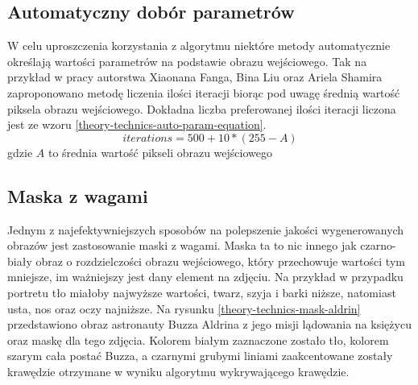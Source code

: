 \documentclass[a4paper, 12pt, polish, twoside]{extreport}
\begin{document}
        \subsection{Automatyczny dobór parametrów}  \label{theory-technics-auto-param}
        W celu uproszczenia korzystania z algorytmu niektóre metody automatycznie określają wartości parametrów na podstawie obrazu wejściowego. Tak na przykład w pracy autorstwa Xiaonana Fanga, Bina Liu oraz Ariela Shamira \cite{article-string-art-xiaonan} zaproponowano metodę liczenia ilości iteracji biorąc pod uwagę średnią wartość piksela obrazu wejściowego. Dokładna liczba preferowanej ilości iteracji liczona jest ze wzoru \ref{theory-technics-auto-param-equation}. 
        \begin{equation} \label{theory-technics-auto-param-equation}
            iterations = 500 + 10 * (255 - A)
        \end{equation}
        gdzie \(A\) to średnia wartość pikseli obrazu wejściowego
        
        \subsection{Maska z wagami}
        Jednym z najefektywniejszych sposobów na polepszenie jakości wygenerowanych obrazów jest zastosowanie maski z wagami. Maska ta to nic innego jak czarno-biały obraz o rozdzielczości obrazu wejściowego, który przechowuje wartości tym mniejsze, im ważniejszy jest dany element na zdjęciu. Na przykład w przypadku portretu tło miałoby najwyższe wartości, twarz, szyja i barki niższe, natomiast usta, nos oraz oczy najniższe. Na rysunku \ref{theory-technics-mask-aldrin} przedstawiono obraz astronauty Buzza Aldrina z jego misji lądowania na księżycu oraz maskę dla tego zdjęcia. Kolorem białym zaznaczone zostało tło, kolorem szarym cała postać Buzza, a czarnymi grubymi liniami zaakcentowane zostały krawędzie otrzymane w wyniku algorytmu wykrywającego krawędzie.
        
\end{document}

